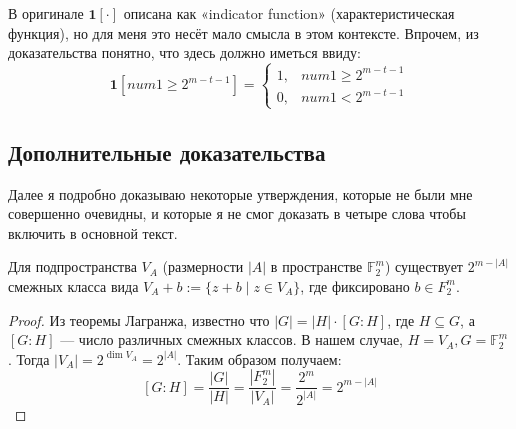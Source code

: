 В оригинале $\mathbf{1}[\cdot]$ описана как «indicator function» (характеристическая функция), но для меня это несёт мало смысла в этом контексте. Впрочем, из доказательства понятно, что здесь должно иметься ввиду:
\[
\mathbf{1}\left[num1 ≥ 2^{m - t - 1}\right] = \begin{cases}
    1,& num1 ≥ 2^{m - t - 1} \\
    0,& num1 < 2^{m - t - 1}
\end{cases}
\]

\subsection{Дополнительные доказательства}

Далее я подробно доказываю некоторые утверждения, которые не были мне совершенно очевидны, и которые я не смог доказать в четыре слова чтобы включить в основной текст.

\begin{lemma*}
    Для подпространства $V_A$ (размерности $|A|$ в пространстве $𝔽_2^m$) существует $2^{m - |A|}$ смежных класса вида $V_A + b := \{z + b \mid z ∈ V_A\}$, где фиксировано $b ∈ F_2^m$.
\end{lemma*}
\begin{proof}
    Из теоремы Лагранжа, известно что $|G| = |H|\cdot[G : H]$, где $H ⊆ G$, а $[G:H]$ — число различных смежных классов. В нашем случае, $H = V_A, G = 𝔽_2^m$. Тогда $|V_A| = 2^{\dim V_A} = 2^{|A|}$. Таким образом получаем:
    \[
    [G : H] = \frac{|G|}{|H|} = \frac{|F_2^m|}{|V_A|} = \frac{2^m}{2^{|A|}} = 2^{m - |A|}
    \tag*{\qedhere}
    \]
\end{proof}

